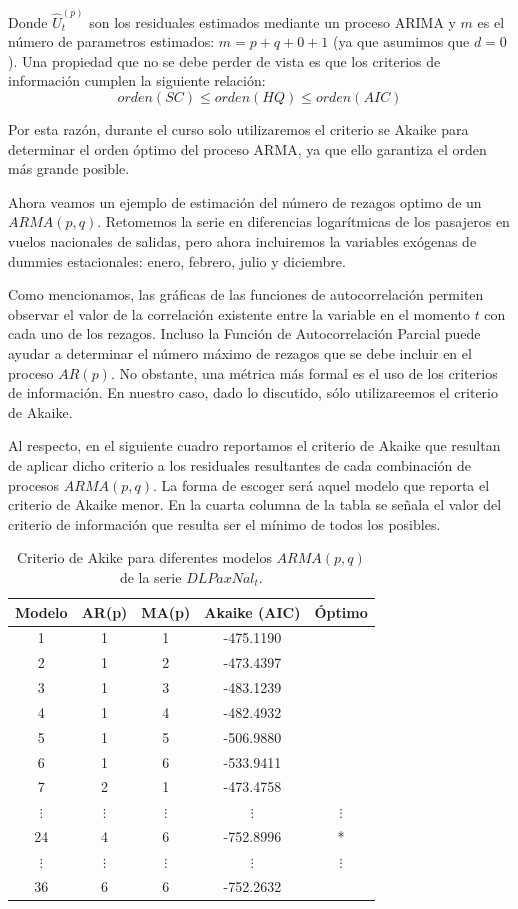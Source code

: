 \documentclass[
]{book}
\begin{document}
Donde \(\hat{U}_t^{(p)}\) son los residuales estimados mediante un proceso ARIMA y \(m\) es el número de parametros estimados: \(m = p + q + 0 + 1\) (ya que asumimos que \(d = 0\)). Una propiedad que no se debe perder de vista es que los criterios de información cumplen la siguiente relación:
\begin{equation}
    orden(SC) \leq orden(HQ) \leq orden(AIC)
\end{equation}

Por esta razón, durante el curso solo utilizaremos el criterio se Akaike para determinar el orden óptimo del proceso ARMA, ya que ello garantiza el orden más grande posible.

Ahora veamos un ejemplo de estimación del número de rezagos optimo de un \(ARMA(p, q)\). Retomemos la serie en diferencias logarítmicas de los pasajeros en vuelos nacionales de salidas, pero ahora incluiremos la variables exógenas de dummies estacionales: enero, febrero, julio y diciembre.

Como mencionamos, las gráficas de las funciones de autocorrelación permiten observar el valor de la correlación existente entre la variable en el momento \(t\) con cada uno de los rezagos. Incluso la Función de Autocorrelación Parcial puede ayudar a determinar el número máximo de rezagos que se debe incluir en el proceso \(AR(p)\). No obstante, una métrica más formal es el uso de los criterios de información. En nuestro caso, dado lo discutido, sólo utilizareemos el criterio de Akaike.

Al respecto, en el siguiente cuadro reportamos el criterio de Akaike que resultan de aplicar dicho criterio a los residuales resultantes de cada combinación de procesos \(ARMA(p, q)\). La forma de escoger será aquel modelo que reporta el criterio de Akaike menor. En la cuarta columna de la tabla se señala el valor del criterio de información que resulta ser el mínimo de todos los posibles.

\begin{table}
\centering
\begin{tabular}{|c | c | c | c | c |}
\hline
    Modelo & AR(p) & MA(p) & Akaike (AIC) & Óptimo \\
\hline
    1 & 1 & 1 & -475.1190 &  \\
    2 & 1 & 2 & -473.4397 &  \\
    3 & 1 & 3 & -483.1239 &  \\
    4 & 1 & 4 & -482.4932 &  \\
    5 & 1 & 5 & -506.9880 &  \\
    6 & 1 & 6 & -533.9411 &  \\
    7 & 2 & 1 & -473.4758 &  \\
    $\vdots$ & $\vdots$ & $\vdots$ & $\vdots$ & $\vdots$ \\
    24 & 4 & 6 & -752.8996 & * \\
    $\vdots$ & $\vdots$ & $\vdots$ & $\vdots$ & $\vdots$ \\
    36 & 6 & 6 & -752.2632 &  \\
\hline
\end{tabular}
\caption{Criterio de Akike para diferentes modelos $ARMA(p, q)$ de la serie $DLPaxNal_t$.}
\end{table}
\end{document}
